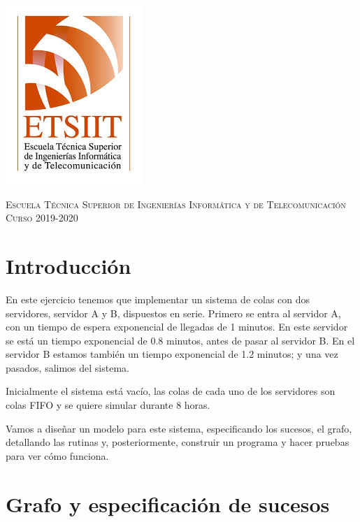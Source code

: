 \documentclass[11pt,a4paper]{article}
\begin{document}
\begin{titlepage}
\begin{minipage}{\textwidth}
\includegraphics[scale=0.3]{img/etsiit.jpeg}

\vspace{0.7cm}
\textsc{Escuela Técnica Superior de Ingenierías Informática y de Telecomunicación}\\
\vspace{1cm}
\textsc{Curso 2019-2020}
\end{minipage}
\end{titlepage}

\tableofcontents
\thispagestyle{empty}				%

\newpage

\setlength{\parskip}{1em}

\section{Introducción}

En este ejercicio tenemos que implementar un sistema de colas con dos servidores, servidor A y B, dispuestos en serie. Primero se entra al servidor A,
con un tiempo de espera exponencial de llegadas de 1 minutos. En este servidor se está un tiempo exponencial de 0.8 minutos, antes de pasar al servidor
B. En el servidor B estamos también un tiempo exponencial de 1.2 minutos; y una vez pasados, salimos del sistema.

Inicialmente el sistema está vacío, las colas de cada uno de los servidores son colas FIFO y se quiere simular durante 8 horas.

Vamos a diseñar un modelo para este sistema, especificando los sucesos, el grafo, detallando las rutinas y, posteriormente, construir un programa y hacer
pruebas para ver cómo funciona.


\section{Grafo y especificación de sucesos}
\end{document}
